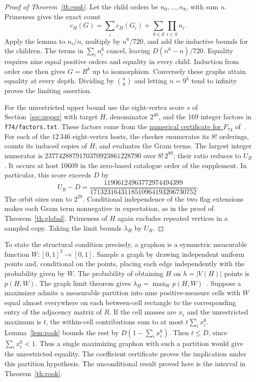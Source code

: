 \begin{proof}[Proof of Theorem~\ref{th:rook}]
Let the child orders be \(n_0,\ldots,n_8\), with sum \(n\).
Primeness gives the exact count
\[
 c_H(G)=\sum_i c_H(G_i)+\sum_{S\in\mathcal S}\prod_{i\in S} n_i.
\]
Apply the lemma to \(n_i/n\), multiply by \(n^6/720\), and add the
inductive bounds for the children. The terms in \(\sum_i n_i^6\)
cancel, leaving \(D(n^6-n)/720\). Equality requires nine equal
positive orders and equality in every child. Induction from order one
then gives \(G=R^k\) up to isomorphism. Conversely these graphs attain
equality at every depth. Dividing by \(\binom n6\) and letting
\(n=9^k\) tend to infinity proves the limiting assertion.

For the unrestricted upper bound use the eight-vertex score \(s\) of
Section~\ref{sec:upper} with target \(H\), denominator \(2^{40}\), and the
169 integer factors in \texttt{f74/factors.txt}. These factors come
from the \href{https://github.com/bodnalev/supplementary_files/blob/9f356bb3dc10dcacd4d26a4eb1d556c2650e4e1b/graph_inducibility_6vtx/certs/inexact_74.pickle}{numerical certificate for \(F_{74}\)} of~\cite{six}.
For each of the \(12\,346\) eight-vertex hosts, the checker enumerates
its \(8!\) orderings, counts its induced copies of \(H\), and evaluates
the Gram terms. The largest integer numerator is
\(2377428879170370923861228790\) over \(8!\,2^{80}\); their ratio
reduces to \(U_R\). It occurs at host 10609 in the zero-based catalogue
order of the supplement. In particular, this score exceeds \(D\) by
\[
 U_R-D=\frac{11906124963772974494399}{1713231643118510964193206730752}.
\]
The orbit sizes sum to \(2^{28}\). Conditional
independence of the two flag extensions makes each Gram term
nonnegative in expectation, as in the proof of Theorem~\ref{th:global}.
Primeness of \(H\) again excludes repeated vertices in a sampled copy.
Taking the limit bounds \(\lambda_H\) by \(U_R\).
\end{proof}

To state the structural condition precisely, a graphon is a symmetric
measurable function \(W:[0,1]^2\to[0,1]\). Sample a graph by drawing
independent uniform points and, conditional on the points, placing
each edge independently with the probability given by \(W\).
The probability of obtaining \(H\) on \(h=|V(H)|\) points is \(p(H,W)\).
The graph limit theorem gives \(\lambda_H=\max_W p(H,W)\)~\cite{limits}.
Suppose a maximizer admits a measurable partition into nine
positive-measure cells with \(W\) equal almost everywhere on each
between-cell rectangle to the corresponding entry of the adjacency
matrix of \(R\). If the cell masses are \(x_i\)
and the unrestricted maximum is \(t\), the within-cell contributions
sum to at most \(t\sum_i x_i^6\). Lemma~\ref{lem:rook} bounds the rest
by \(D(1-\sum_i x_i^6)\). Then \(t\le D\), since \(\sum_i x_i^6<1\).
Thus a single maximizing graphon with such a partition would give the
unrestricted equality. The coefficient certificate proves the implication
under this partition hypothesis. The unconditional result proved here
is the interval in Theorem~\ref{th:rook}.

